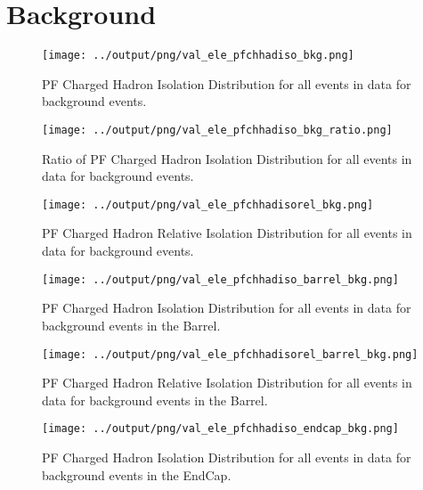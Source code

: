 \documentclass[11pt]{book}
\begin{document}
\clearpage





\section{Background}
\begin{figure}[htb]
\centering
\texttt{[image: ../output/png/val\_ele\_pfchhadiso\_bkg.png]}
\caption{PF Charged Hadron Isolation Distribution for all events in data for background events.}
\label{fig:val_ele_pfchhadiso_bkg}
\end{figure}

\begin{figure}[htb]
\centering
\texttt{[image: ../output/png/val\_ele\_pfchhadiso\_bkg\_ratio.png]}
\caption{Ratio of PF Charged Hadron Isolation Distribution for all events in data for background events.}
\label{fig:val_ele_pfchhadiso_bkg_ratio}
\end{figure}

\begin{figure}[htb]
\centering
\texttt{[image: ../output/png/val\_ele\_pfchhadisorel\_bkg.png]}
\caption{PF Charged Hadron Relative Isolation Distribution for all events in data for background events.}
\label{fig:val_ele_pfchhadisorel_bkg}
\end{figure}

\begin{figure}[htb]
\centering
\texttt{[image: ../output/png/val\_ele\_pfchhadiso\_barrel\_bkg.png]}
\caption{PF Charged Hadron Isolation Distribution for all events in data for background events in the Barrel.}
\label{fig:val_ele_pfchhadiso_barrel_bkg}
\end{figure}

\begin{figure}[htb]
\centering
\texttt{[image: ../output/png/val\_ele\_pfchhadisorel\_barrel\_bkg.png]}
\caption{PF Charged Hadron Relative Isolation Distribution for all events in data for background events in the Barrel.}
\label{fig:val_ele_pfchhadisorel_barrel_bkg}
\end{figure}

\begin{figure}[htb]
\centering
\texttt{[image: ../output/png/val\_ele\_pfchhadiso\_endcap\_bkg.png]}
\caption{PF Charged Hadron Isolation Distribution for all events in data for background events in the EndCap.}
\label{fig:val_ele_pfchhadiso_endcap_bkg}
\end{figure}
\end{document}
